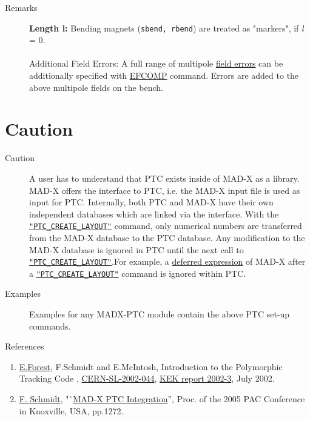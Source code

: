 \begin{description}
      \item[Remarks]
	\textbf{Length l: }Bending magnets (\texttt{sbend,  rbend}) are
        treated as "markers", if \textit{l} = 0. 
        \\ \\
        Additional Field Errors: A full range of multipole
        \href{../error/error_field.html}{ field errors} can be
        additionally specified with
        \href{../error/error_field.html#efcomp}{ EFCOMP} command. Errors
        are added to the above multipole  fields on the bench. 
\end{description}

\section{Caution}

\begin{description}
      \item[Caution] A user has to understand that PTC exists inside
        of MAD-X as a  library. MAD-X offers the interface to PTC,
        i.e. the MAD-X input file is used as input for
        PTC. Internally, both PTC and MAD-X have their own
        independent databases which are linked via the interface. With
        the
        \texttt{\hyperlink{PTC_CREATE_LAYOUT}{"PTC\_CREATE\_LAYOUT"}}
        command, only numerical numbers are transferred from the MAD-X
        database to the PTC database. Any modification to the MAD-X
        database is ignored in PTC until the next call to
        \texttt{\hyperlink{PTC_CREATE_LAYOUT}{"PTC\_CREATE\_LAYOUT"}}.For
        example, a
        \href{../Introduction/expression.html#defer}{deferred
          expression} of MAD-X after a
        \texttt{\hyperlink{PTC_CREATE_LAYOUT}{"PTC\_CREATE\_LAYOUT"}} command is ignored within PTC. 
      \item[Examples] Examples for any MADX-PTC module contain the
        above PTC set-up commands. 
      \item[References] 
\end{description}

\begin{enumerate}
   \item \href{E.Forest}{E.Forest}, F.Schmidt and E.McIntosh,
     Introduction to the Polymorphic Tracking Code ,
     \href{http://cern.ch/madx/doc/sl-2002-044.pdf}{CERN-SL-2002-044},
     \href{http://ccdb4fs.kek.jp/cgi-bin/img/allpdf?200302020}{KEK
       report 2002-3}, July 2002. 
   \item \href{F.Schmidt}{F. Schmidt},
     "`\href{http://cern.ch/madx/doc/MPPE012.pdf}{MAD-X PTC
     Integration}'', Proc. of the 2005 PAC Conference in
     Knoxville, USA, pp.1272. 
\end{enumerate}


